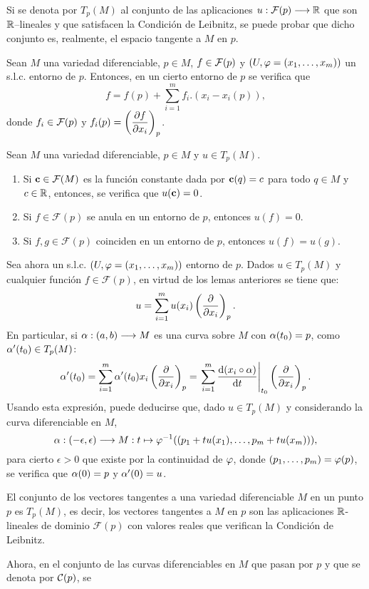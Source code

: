 \documentclass[cursovd_portada.tex]{subfiles}
\begin{document}
\hs Si se denota por $T_p(M)$ al conjunto de las aplicaciones $u:\mathcal{F}(p)\longrightarrow\mathbb{R}$ que son $\mathbb{R}$--lineales y que
satisfacen la Condici\'{o}n de Leibnitz, se puede probar que dicho conjunto es, realmente, el espacio tangente a $M$
en $p$.
\begin{lemma}
Sean $M$ una variedad diferenciable, $p\in M$, $f\in{\cal F}(p)$ y $(U,\varphi=(x_1,\dots ,x_m))$ un s.l.c. entorno de
$p$. Entonces, en un cierto entorno de $p$ se verifica que
$$f=f(p)+\sum_{i=1}^mf_i.(x_i-x_i(p)),$$
donde $f_i\in{\cal F}(p)$ y $f_i(p)=\left(\displaystyle{\frac{\partial f}{\partial x_i}}\right)_p$.
\end{lemma}
\begin{lemma} Sean $M$ una variedad diferenciable, $p\in M$ y $u\in T_p(M)$.
\begin{enumerate}
\item Si ${\bf c}\in{\cal F}(M)$ es la funci\'{o}n constante dada por ${\bf c}(q)=c$ para todo $q\in M$ y $c\in\mathbb{R}$,
entonces, se verifica que $u({\bf c})=0$.
\item Si $f\in\mathcal{F}(p)$ se anula en un entorno de $p$, entonces $u(f)=0$.
\item Si $f,g\in\mathcal{F}(p)$ coinciden en un entorno de $p$, entonces $u(f)=u(g)$.
\end{enumerate}
\end{lemma}
Sea ahora un s.l.c. $(U,\varphi=(x_1,\dots ,x_m))$ entorno de $p$. Dados $u\in T_p(M)$ y cualquier funci\'{o}n
$f\in\mathcal{F}(p)$, en virtud de los lemas anteriores se tiene que:
$$u=\sum_{i=1}^mu(x_i)\left(\displaystyle{\frac{\partial}{\partial x_i}}\right)_p.$$
\hs En particular, si $\alpha:(a,b)\longrightarrow M$ es una curva sobre $M$ con $\alpha(t_0)=p$, como $\alpha'(t_0)\in T_p(M)$:
$$\alpha'(t_0)=\sum_{i=1}^m\alpha'(t_0)x_i\left(\displaystyle{\frac{\partial}{\partial x_i}}\right)_p=
\left.\sum_{i=1}^m\displaystyle{\frac{{\rm d} (x_i\circ\alpha)}{{\rm d} t}}\right|_{t_0}\left(\displaystyle{\frac{\partial}{\partial x_i}}\right)_p.$$ \hs Usando esta expresi\'{o}n, puede
deducirse que, dado $u\in T_p(M)$ y considerando la curva diferenciable en $M$,
$$\alpha:(-\epsilon,\epsilon)\longrightarrow M:t\mapsto \varphi^{-1}((p_1+tu(x_1),\dots ,p_m+tu(x_m))),$$
para cierto $\epsilon>0$ que existe por la continuidad de $\varphi$, donde $(p_1,\dots ,p_m)=\varphi(p)$, se verifica que
$\alpha(0)=p$ y $\alpha'(0)=u$.
\begin{teorema}
El conjunto de los vectores tangentes a una variedad diferenciable $M$ en un punto $p$ es $T_p(M)$, es decir, los
vectores tangentes a $M$ en $p$ son las aplicaciones $\mathbb{R}$-lineales de dominio $\mathcal{F}(p)$ con valores reales
que verifican la Condici\'{o}n de Leibnitz.
\end{teorema}
Ahora, en el conjunto de las curvas diferenciables en $M$ que pasan por $p$ y que se denota por ${\cal C}(p)$, se
\end{document}
